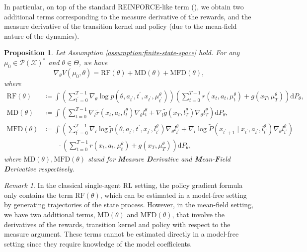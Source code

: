 \documentclass[11pt]{article}
\numberwithin{equation}{section}
\newtheorem{proposition}[theorem]{Proposition}
\theoremstyle{definition}
\theoremstyle{remark}
\newtheorem{remark}{Remark}[section]
\def \Th{\Theta} \def \Del{\Delta}
\def\cX{\mathcal{X}}
\def\d{{\mathrm{d}}}
\newcommand{\citet}{\cite}
\begin{document}
In particular, on top of the standard REINFORCE-like term (\citet{williams1992simple}), we obtain two additional terms corresponding to the measure derivative of the rewards, and the measure derivative of the transition kernel and policy (due to the mean-field nature of the dynamics).
\begin{proposition}
\label{proposition:exact-policy-gradient-formula}
    Let Assumption \ref{assumption:finite-state-space} hold. For any $\mu_0 \in \mathcal P(\cX)^*$ and $\theta \in \Th$, we have
    \begin{equation}
        \label{eq:exact-policy-gradient-formula}
        \nabla_{\theta} V(\mu_0, \theta) =  \mathrm{RF}(\theta) + \mathrm{MD}(\theta)+\mathrm{MFD}(\theta),
    \end{equation}
    where
    \begin{equation}
        \label{eq:decomposition-exact-policy-gradient}
\begin{aligned}
  \mathrm{RF}(\theta) & \coloneq  \int  \left( \sum_{t^\prime = 0}^{T - 1} \nabla_{\theta} \log p(\theta, a_{t^\prime},t^\prime,x_{t^\prime},\mu_{t^\prime}^\theta) \right)
    \left(\sum_{t = 0}^{T - 1} r(x_t, a_t, \mu_t^\theta)  + g(x_T, \mu_T^\theta)\right) \d P_{\theta},\\
\mathrm{MD}(\theta) &\coloneq \int \left(\sum_{t = 0}^{T - 1} \nabla_{l} \tilde r(x_t, a_t, l_t^\theta) \nabla_{\theta}l_t^\theta  + \nabla_{l} \tilde g (x_T, l_T^\theta) \nabla_{\theta}l_T^\theta \right) \d P_{\theta}, \\
\mathrm{MFD}(\theta) &\coloneq \int \left( \sum_{t^\prime = 0}^{T - 1} \nabla_{l} \log \tilde p(\theta, a_{t^\prime},t^\prime,x_{t^\prime},l_{t^\prime}^\theta) \nabla_{\theta} l_{t^\prime}^\theta + \nabla_{l} \log \tilde P(x_{t^\prime + 1} \mid x_{t^\prime},a_{t^{\prime}}, l_{t^\prime}^\theta) \nabla_{\theta} l_{t^\prime}^\theta \right) \\
&\qquad \cdot \left(\sum_{t = 0}^{T - 1} r(x_t, a_t, \mu_t^\theta)  + g(x_T, \mu_T^\theta)\right) \d P_{\theta},
\end{aligned}
\end{equation}
where $\mathrm{MD}(\theta), \mathrm{MFD}(\theta)$ stand for \textbf{M}easure \textbf{D}erivative and \textbf{M}ean-\textbf{F}ield \textbf{D}erivative respectively. 
\end{proposition}

\begin{remark}
\label{remark:single-agent-remark}
    In the classical single-agent RL setting, the policy gradient formula only contains the term $\mathrm{RF}(\theta)$, 
    which can be estimated in a model-free setting by generating trajectories of the state process. 
    However, in the mean-field setting, we have two additional terms, $\mathrm{MD}(\theta)$ and $\mathrm{MFD}(\theta)$, that involve the derivatives of the rewards, transition kernel and policy with respect to the measure argument. 
    These terms cannot be estimated directly in a model-free setting since they require knowledge of the model coefficients. 
\end{remark}
\end{document}
